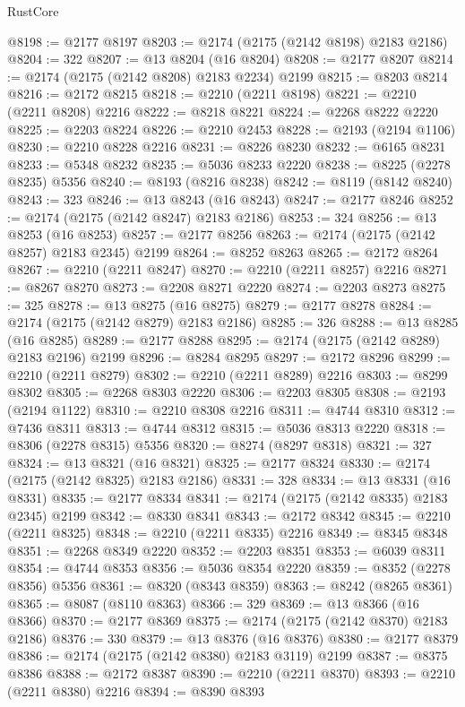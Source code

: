\begin{lexlean}{RustCore}
\begin{coremodule}
@8198 := @2177 @8197
@8203 := @2174 (@2175 (@2142 @8198) @2183 @2186)
@8204 := 322
@8207 := @13 @8204 (@16 @8204)
@8208 := @2177 @8207
@8214 := @2174 (@2175 (@2142 @8208) @2183 @2234) @2199
@8215 := @8203 @8214
@8216 := @2172 @8215
@8218 := @2210 (@2211 @8198)
@8221 := @2210 (@2211 @8208) @2216
@8222 := @8218 @8221
@8224 := @2268 @8222 @2220
@8225 := @2203 @8224
@8226 := @2210 @2453
@8228 := @2193 (@2194 @1106)
@8230 := @2210 @8228 @2216
@8231 := @8226 @8230
@8232 := @6165 @8231
@8233 := @5348 @8232
@8235 := @5036 @8233 @2220
@8238 := @8225 (@2278 @8235) @5356
@8240 := @8193 (@8216 @8238)
@8242 := @8119 (@8142 @8240)
@8243 := 323
@8246 := @13 @8243 (@16 @8243)
@8247 := @2177 @8246
@8252 := @2174 (@2175 (@2142 @8247) @2183 @2186)
@8253 := 324
@8256 := @13 @8253 (@16 @8253)
@8257 := @2177 @8256
@8263 := @2174 (@2175 (@2142 @8257) @2183 @2345) @2199
@8264 := @8252 @8263
@8265 := @2172 @8264
@8267 := @2210 (@2211 @8247)
@8270 := @2210 (@2211 @8257) @2216
@8271 := @8267 @8270
@8273 := @2208 @8271 @2220
@8274 := @2203 @8273
@8275 := 325
@8278 := @13 @8275 (@16 @8275)
@8279 := @2177 @8278
@8284 := @2174 (@2175 (@2142 @8279) @2183 @2186)
@8285 := 326
@8288 := @13 @8285 (@16 @8285)
@8289 := @2177 @8288
@8295 := @2174 (@2175 (@2142 @8289) @2183 @2196) @2199
@8296 := @8284 @8295
@8297 := @2172 @8296
@8299 := @2210 (@2211 @8279)
@8302 := @2210 (@2211 @8289) @2216
@8303 := @8299 @8302
@8305 := @2268 @8303 @2220
@8306 := @2203 @8305
@8308 := @2193 (@2194 @1122)
@8310 := @2210 @8308 @2216
@8311 := @4744 @8310
@8312 := @7436 @8311
@8313 := @4744 @8312
@8315 := @5036 @8313 @2220
@8318 := @8306 (@2278 @8315) @5356
@8320 := @8274 (@8297 @8318)
@8321 := 327
@8324 := @13 @8321 (@16 @8321)
@8325 := @2177 @8324
@8330 := @2174 (@2175 (@2142 @8325) @2183 @2186)
@8331 := 328
@8334 := @13 @8331 (@16 @8331)
@8335 := @2177 @8334
@8341 := @2174 (@2175 (@2142 @8335) @2183 @2345) @2199
@8342 := @8330 @8341
@8343 := @2172 @8342
@8345 := @2210 (@2211 @8325)
@8348 := @2210 (@2211 @8335) @2216
@8349 := @8345 @8348
@8351 := @2268 @8349 @2220
@8352 := @2203 @8351
@8353 := @6039 @8311
@8354 := @4744 @8353
@8356 := @5036 @8354 @2220
@8359 := @8352 (@2278 @8356) @5356
@8361 := @8320 (@8343 @8359)
@8363 := @8242 (@8265 @8361)
@8365 := @8087 (@8110 @8363)
@8366 := 329
@8369 := @13 @8366 (@16 @8366)
@8370 := @2177 @8369
@8375 := @2174 (@2175 (@2142 @8370) @2183 @2186)
@8376 := 330
@8379 := @13 @8376 (@16 @8376)
@8380 := @2177 @8379
@8386 := @2174 (@2175 (@2142 @8380) @2183 @3119) @2199
@8387 := @8375 @8386
@8388 := @2172 @8387
@8390 := @2210 (@2211 @8370)
@8393 := @2210 (@2211 @8380) @2216
@8394 := @8390 @8393

\end{coremodule}
\end{lexlean}
